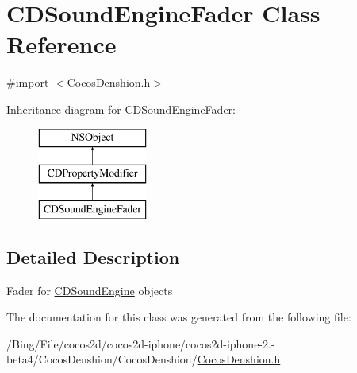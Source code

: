 \hypertarget{interface_c_d_sound_engine_fader}{\section{C\-D\-Sound\-Engine\-Fader Class Reference}
\label{interface_c_d_sound_engine_fader}
}


{\ttfamily \#import $<$Cocos\-Denshion.\-h$>$}

Inheritance diagram for C\-D\-Sound\-Engine\-Fader\-:\begin{figure}[H]
\begin{center}
\leavevmode
\includegraphics[height=3.000000cm]{interface_c_d_sound_engine_fader}
\end{center}
\end{figure}


\subsection{Detailed Description}
Fader for \hyperlink{interface_c_d_sound_engine}{C\-D\-Sound\-Engine} objects 

The documentation for this class was generated from the following file\-:\begin{DoxyCompactItemize}
\item 
/\-Bing/\-File/cocos2d/cocos2d-\/iphone/cocos2d-\/iphone-\/2.-\/beta4/\-Cocos\-Denshion/\-Cocos\-Denshion/\hyperlink{_cocos_denshion_8h}{Cocos\-Denshion.\-h}\end{DoxyCompactItemize}
